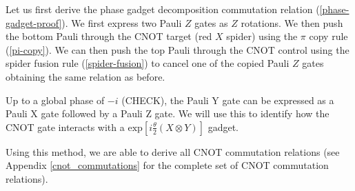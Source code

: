 Let us first derive the phase gadget decomposition commutation relation (\ref{phase-gadget-proof}). We first express two Pauli $Z$ gates as $Z$ rotations. We then push the bottom Pauli through the CNOT target (red $X$ spider) using the $\pi$ copy rule (\ref{pi-copy}). We can then push the top Pauli through the CNOT control using the spider fusion rule (\ref{spider-fusion}) to cancel one of the copied Pauli $Z$ gates obtaining the same relation as before.


Up to a global phase of $-i$ (CHECK), the Pauli Y gate can be expressed as a Pauli X gate followed by a Pauli Z gate. We will use this to identify how the CNOT gate interacts with a $\text{exp} [i\frac{\theta}{2} (X \otimes Y)]$ gadget.


Using this method, we are able to derive all CNOT commutation relations (see Appendix \ref{cnot_commutations} for the complete set of CNOT commutation relations).
